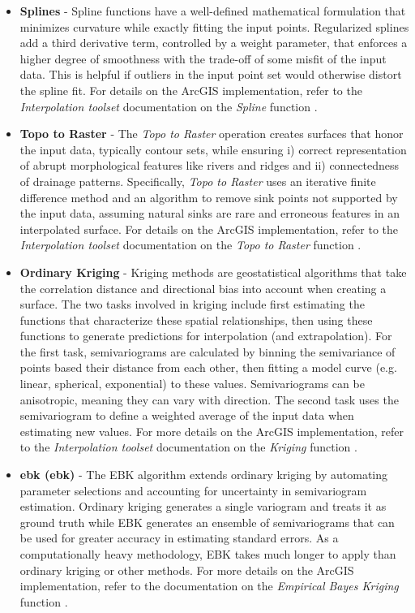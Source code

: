 \begin{itemize}
\item{\textbf{Splines}}\label{ch3:splines} - Spline functions have a well-defined mathematical formulation that minimizes curvature while exactly fitting the input points. Regularized splines add a third derivative term, controlled by a weight parameter, that enforces a higher degree of smoothness with the trade-off of some misfit of the input data. This is helpful if outliers in the input point set would otherwise distort the spline fit. For details on the ArcGIS implementation, refer to the \textit{Interpolation toolset} documentation on the \textit{Spline} function \citep{esri_spline_2021}.
\item{\textbf{Topo to Raster}}\label{ch3:topo2r} - The \textit{Topo to Raster} operation creates surfaces that honor the input data, typically contour sets, while ensuring i) correct representation of abrupt morphological features like rivers and ridges and ii) connectedness of drainage patterns. Specifically, \textit{Topo to Raster} uses an iterative finite difference method and an algorithm to remove sink points not supported by the input data, assuming natural sinks are rare and erroneous features in an interpolated surface. For details on the ArcGIS implementation, refer to the \textit{Interpolation toolset} documentation on the \textit{Topo to Raster} function \citep{esri_topo_2021}.
\item{\textbf{Ordinary Kriging}}\label{ch3:kriging} - Kriging methods are geostatistical algorithms that take the correlation distance and directional bias into account when creating a surface. The two tasks involved in kriging include first estimating the functions that characterize these spatial relationships, then using these functions to generate predictions for interpolation (and extrapolation). For the first task, semivariograms are calculated by binning the semivariance of points based their distance from each other, then fitting a model curve (e.g. linear, spherical, exponential) to these values. Semivariograms can be anisotropic, meaning they can vary with direction. The second task uses the semivariogram to define a weighted average of the input data when estimating new values. For more details on the ArcGIS implementation, refer to the \textit{Interpolation toolset} documentation on the \textit{Kriging} function \citep{esri_kriging_2021}.
\item{\textbf{\acrlong{ebk} (\acrshort{ebk})}}\label{ch3:ebk} - The EBK algorithm extends ordinary kriging by automating parameter selections and accounting for uncertainty in semivariogram estimation. Ordinary kriging generates a single variogram and treats it as ground truth while EBK generates an ensemble of semivariograms that can be used for greater accuracy in estimating standard errors. As a computationally heavy methodology, EBK takes much longer to apply than ordinary kriging or other methods. For more details on the ArcGIS implementation, refer to the documentation on the \textit{Empirical Bayes Kriging} function \citep{esri_empirical_2021}.

\end{itemize}


